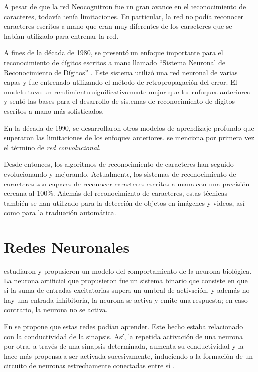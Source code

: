 A pesar de que la red Neocognitron fue un gran avance en el reconocimiento de caracteres, todavía tenía limitaciones.
En particular, la red no podía reconocer caracteres escritos a mano que eran muy diferentes de los caracteres que se
habían utilizado para entrenar la red.

A fines de la década de 1980, se presentó un enfoque importante para el reconocimiento de dígitos escritos a mano
llamado ``Sistema Neuronal de Reconocimiento de Dígitos'' \parencite{lecun1989backpropagation}. Este sistema utilizó una red neuronal de varias capas y fue entrenado utilizando el
método de retropropagación del error. El modelo tuvo un rendimiento significativamente mejor que los enfoques
anteriores y sentó las bases para el desarrollo de sistemas de reconocimiento de dígitos escritos a mano más
sofisticados.

En la década de 1990, se desarrollaron otros modelos de aprendizaje profundo que superaron las limitaciones de los
enfoques anteriores. \cite{lecun1995learning} se menciona por primera vez el término de {\it red convolucional}.

Desde entonces, los algoritmos de reconocimiento de caracteres han seguido evolucionando y mejorando. Actualmente, los
sistemas de reconocimiento de caracteres son capaces de reconocer caracteres escritos a mano con una precisión cercana
al 100\%. Además del reconocimiento de caracteres, estas técnicas también se han utilizado para la detección de objetos
en imágenes y videos, así como para la traducción automática.

\section{Redes Neuronales}
\cite{mcculloch1943logical} estudiaron y propusieron un modelo del comportamiento de la
neurona biológica. La neurona artificial que propusieron fue un sistema binario que consiste en que si la suma de entradas excitatorias supera un umbral de activación, y además no
hay una entrada inhibitoria, la neurona se activa y emite una respuesta; en caso contrario, la neurona no se activa.

En \citeyear{hebb1949organization} se propone que estas redes podían aprender. Este hecho estaba relacionado con la
conductividad de la sinapsis. Así, la repetida activación de una neurona por otra, a través de una sinapsis
determinada, aumenta su conductividad y la hace más propensa a ser activada sucesivamente, induciendo a la formación de
un circuito de neuronas estrechamente conectadas entre sí \parencite{hebb1949organization}.

